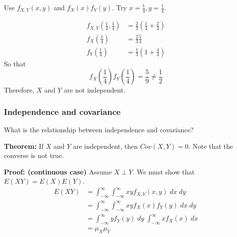 \documentclass[12pt]{article}
\begin{document}
Use $f_{X,Y} (x,y)$ and $f_X (x) f_Y (y)$. Try $x = \frac{1}{4}, y = \frac{1}{4}$.

\begin{align*}
    f_{X,Y} (\frac{1}{4}, \frac{1}{4}) &= \frac{2}{3} (\frac{1}{4} + \frac{2}{4}) \\
    f_X (\frac{1}{4}) &= \frac{2}{3} \frac{5}{4} \\
    f_Y (\frac{1}{4}) &= \frac{1}{3} (1 + \frac{4}{4})
\end{align*}
So that
\[
    f_X (\frac{1}{4}) f_Y (\frac{1}{4}) = \frac{5}{9} \neq \frac{1}{2}
\]
Therefore, $X$ and $Y$ are not independent. 

\subsubsection{Independence and covariance}
What is the relationship between independence and covariance?

\textbf{Theorem:} If $X$ and $Y$ are independent, then $Cov(X,Y) = 0$. Note that the converse is not true.

\textbf{Proof: (continuous case)} Assume $X \perp Y$. We must show that $E(XY) = E(X)E(Y)$.
\begin{align*}
    E(XY) &= \int_{-\infty}^{\infty} \int_{-\infty}^{\infty} x y f_{X,Y} (x,y) \; dx \; dy \\
         &= \int_{-\infty}^{\infty} \int_{-\infty}^{\infty} x y f_X (x) f_Y (y) \; dx \; dy \\
         &= \int_{-\infty}^{\infty} y f_Y (y) \; dy \; \int_{-\infty}^{\infty} x f_X (x) \; dx \\
         &= \mu_X \mu_Y 
\end{align*}
\end{document}
